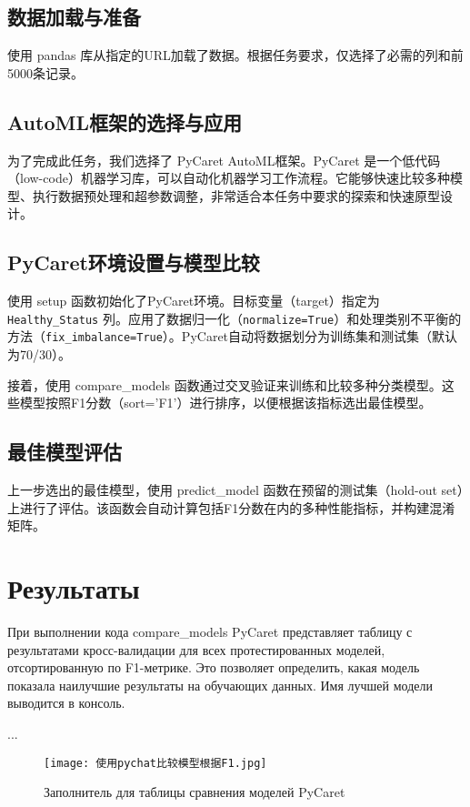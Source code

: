 \documentclass{article}
\providecommand{\pcsync}{\par\vspace{\baselineskip}}
\begin{document}
\begin{paracol}{2}
\subsection{数据加载与准备}\label{subsec2}
\pcsync
使用 pandas 库从指定的URL加载了数据。根据任务要求，仅选择了必需的列和前5000条记录。

\subsection{AutoML框架的选择与应用 }\label{subsec3}
\pcsync
为了完成此任务，我们选择了 PyCaret AutoML框架。PyCaret 是一个低代码（low-code）机器学习库，可以自动化机器学习工作流程。它能够快速比较多种模型、执行数据预处理和超参数调整，非常适合本任务中要求的探索和快速原型设计。

\subsection{PyCaret环境设置与模型比较 }\label{subsec4}
\pcsync
使用 setup 函数初始化了PyCaret环境。目标变量（target）指定为 \texttt{Healthy\_Status} 列。应用了数据归一化（\texttt{normalize=True}）和处理类别不平衡的方法（\texttt{fix_imbalance=True}）。PyCaret自动将数据划分为训练集和测试集（默认为70/30）。

接着，使用 compare_models 函数通过交叉验证来训练和比较多种分类模型。这些模型按照F1分数（sort='F1'）进行排序，以便根据该指标选出最佳模型。
\subsection{最佳模型评估 }\label{subsec5}
\pcsync
上一步选出的最佳模型，使用 predict_model 函数在预留的测试集（hold-out set）上进行了评估。该函数会自动计算包括F1分数在内的多种性能指标，并构建混淆矩阵。
\switchcolumn*

\section{Результаты}
\pcsync
При выполнении кода compare_models PyCaret представляет таблицу с результатами кросс-валидации для всех протестированных моделей, отсортированную по F1-метрике. Это позволяет определить, какая модель показала наилучшие результаты на обучающих данных. Имя лучшей модели выводится в консоль.

...

\begin{figure}[H]
    \centering
    \texttt{[image: 使用pychat比较模型根据F1.jpg]}
    \caption{Заполнитель для таблицы сравнения моделей PyCaret}
    \label{fig:enter-label}
\end{figure}


\end{paracol}
\end{document}
